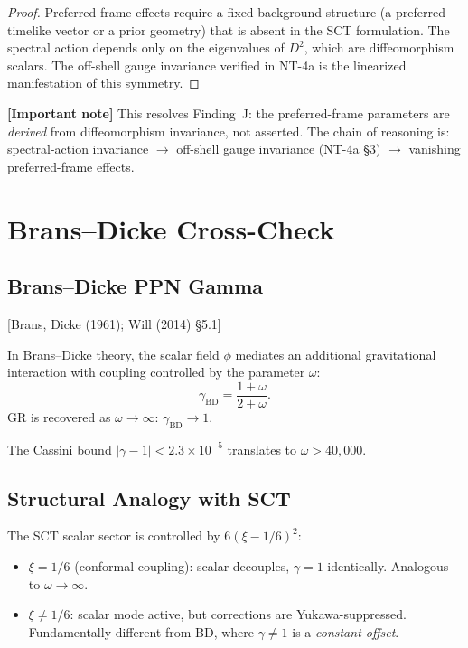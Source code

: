 \documentclass[11pt,a4paper]{article}
\theoremstyle{plain}
\theoremstyle{definition}
\theoremstyle{remark}
\newcommand{\fromlit}[1]{\textcolor{blue!70!black}{\textsf{[#1]}}}
\newcommand{\signcorrection}[1]{%
  \par\smallskip\noindent
  \colorbox{red!10}{\parbox{\dimexpr\linewidth-2\fboxsep}{%
    \textcolor{red!60!black}{\textbf{[Important note]}} #1}}%
  \par\smallskip}
\begin{document}
\begin{proof}
Preferred-frame effects require a fixed background structure (a
preferred timelike vector or a prior geometry) that is absent in the
SCT formulation.  The spectral action depends only on the eigenvalues
of $D^2$, which are diffeomorphism scalars.  The off-shell gauge
invariance verified in NT-4a is the linearized manifestation of this
symmetry.
\end{proof}

\signcorrection{This resolves Finding~J: the preferred-frame
parameters are \emph{derived} from diffeomorphism invariance, not
asserted.  The chain of reasoning is:
spectral-action invariance $\to$ off-shell gauge invariance (NT-4a
\S3) $\to$ vanishing preferred-frame effects.}

\section{Brans--Dicke Cross-Check}\label{sec:BD}

\subsection{Brans--Dicke PPN Gamma}

\fromlit{Brans, Dicke (1961); Will (2014) \S5.1}

In Brans--Dicke theory, the scalar field $\phi$ mediates an additional
gravitational interaction with coupling controlled by the parameter
$\omega$:
\begin{equation}\label{eq:gamma-BD}
  \gamma_{\mathrm{BD}} = \frac{1 + \omega}{2 + \omega}.
\end{equation}
GR is recovered as $\omega \to \infty$: $\gamma_{\mathrm{BD}} \to 1$.

The Cassini bound $|\gamma - 1| < 2.3 \times 10^{-5}$ translates to
$\omega > 40{,}000$.

\subsection{Structural Analogy with SCT}

The SCT scalar sector is controlled by $6(\xi - 1/6)^2$:
\begin{itemize}[nosep]
  \item $\xi = 1/6$ (conformal coupling): scalar decouples,
    $\gamma = 1$ identically.  Analogous to $\omega \to \infty$.
  \item $\xi \neq 1/6$: scalar mode active, but corrections are
    Yukawa-suppressed.  Fundamentally different from BD, where
    $\gamma \neq 1$ is a \emph{constant offset}.
\end{itemize}
\end{document}
